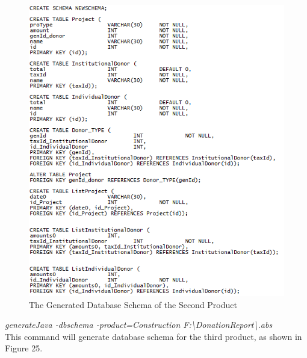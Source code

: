 \documentclass[runningheads,a4paper]{llncs}
\begin{document}
\begin{figure}
	\centering
	\includegraphics[scale=0.7]{create2.png}
	\caption{The Generated Database Schema of the Second Product}
	\label{Figure 24}
\end{figure}

\emph{generateJava -dbschema -product=Construction F:\textbackslash DonationReport\textbackslash *.abs}\\

This command will generate database schema for the third product, as shown in Figure 25.\\
\end{document}
